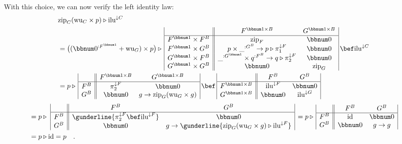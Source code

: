 With this choice, we can now verify the left identity law:
\begin{align*}
 & \text{zip}_{C}(\text{wu}_{C}\times p)\triangleright\text{ilu}^{\downarrow C}\\
 & =\big((\bbnum 0^{:F^{\bbnum 1}}+\text{wu}_{G})\times p\big)\triangleright\,\begin{array}{|c||cc|}
 & F^{\bbnum 1\times B} & G^{\bbnum 1\times B}\\
\hline F^{\bbnum 1}\times F^{B} & \text{zip}_{F} & \bbnum 0\\
F^{\bbnum 1}\times G^{B} & p\times\_^{:G^{B}}\rightarrow p\triangleright\pi_{1}^{\downarrow F} & \bbnum 0\\
G^{\bbnum 1}\times F^{B} & \_^{:G^{\bbnum 1}}\times q^{:F^{B}}\rightarrow q\triangleright\pi_{2}^{\downarrow F} & \bbnum 0\\
G^{\bbnum 1}\times G^{B} & \bbnum 0 & \text{zip}_{G}
\end{array}\,\bef\text{ilu}^{\downarrow C}\\
 & =p\triangleright\,\begin{array}{|c||cc|}
 & F^{\bbnum 1\times B} & G^{\bbnum 1\times B}\\
\hline F^{B} & \pi_{2}^{\downarrow F} & \bbnum 0\\
G^{B} & \bbnum 0 & g\rightarrow\text{zip}_{G}(\text{wu}_{G}\times g)
\end{array}\,\bef\,\begin{array}{|c||cc|}
 & F^{B} & G^{B}\\
\hline F^{\bbnum 1\times B} & \text{ilu}^{\downarrow F} & \bbnum 0\\
G^{\bbnum 1\times B} & \bbnum 0 & \text{ilu}^{\downarrow G}
\end{array}
\end{align*}
\begin{align*}
 & =p\triangleright\,\,\begin{array}{|c||cc|}
 & F^{B} & G^{B}\\
\hline F^{B} & \gunderline{\pi_{2}^{\downarrow F}\bef\text{ilu}^{\downarrow F}} & \bbnum 0\\
G^{B} & \bbnum 0 & g\rightarrow\gunderline{\text{zip}_{G}(\text{wu}_{G}\times g)\triangleright\text{ilu}^{\downarrow F}}
\end{array}\,=p\triangleright\,\begin{array}{|c||cc|}
 & F^{B} & G^{B}\\
\hline F^{B} & \text{id} & \bbnum 0\\
G^{B} & \bbnum 0 & g\rightarrow g
\end{array}\\
 & =p\triangleright\text{id}=p\quad.
\end{align*}

